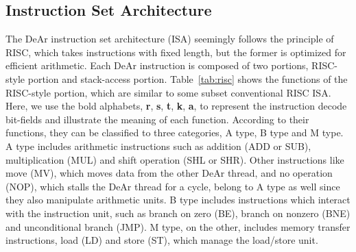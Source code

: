 \subsection{Instruction Set Architecture}
\label{sec:isa}
\indent The DeAr instruction set architecture (ISA) seemingly follows the principle of RISC, which takes instructions with fixed length, 
but the former is optimized for efficient arithmetic.
Each DeAr instruction is composed of two portions, RISC-style portion and stack-access portion.
Table~\ref{tab:risc} shows the functions of the RISC-style portion, which are similar to some subset conventional RISC ISA.
Here, we use the bold alphabets, \textbf{r}, \textbf{s}, \textbf{t}, \textbf{k}, \textbf{a}, 
to represent the instruction decode bit-fields and illustrate the meaning of each function.
According to their functions, they can be classified to three categories, A type, B type and M type.
A type includes arithmetic instructions such as addition (ADD or SUB), multiplication (MUL) and shift operation (SHL or SHR).
Other instructions like move (MV), which moves data from the other DeAr thread, 
and no operation (NOP), which stalls the DeAr thread for a cycle, 
belong to A type as well since they also manipulate arithmetic units.
B type includes instructions which interact with the instruction unit, such as branch on zero (BE), branch on nonzero (BNE) and unconditional branch (JMP).
M type, on the other, includes memory transfer instructions, load (LD) and store (ST), which manage the load/store unit.
